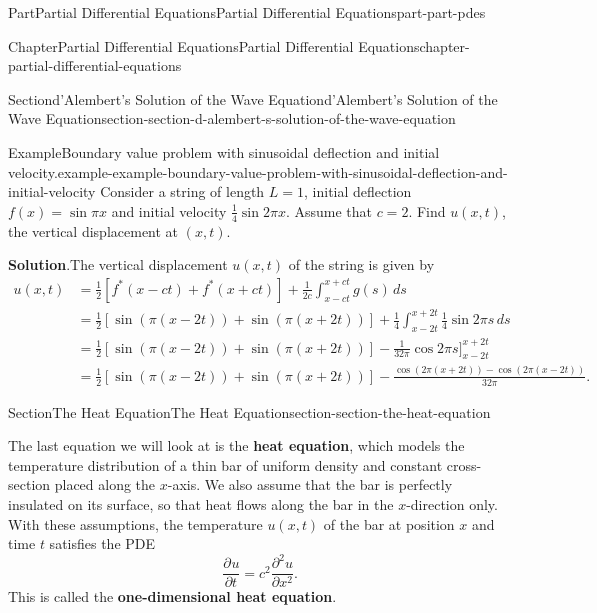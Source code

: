 \documentclass[twoside,10pt,]{book}
\newcommand{\blocktitlefont}{\relax}
\newcommand{\terminology}[1]{\textbf{#1}}
\numberwithin{equation}{part}
\newcommand{\pdv}[3][]{\dfrac{\partial^{#1} #2}{\partial #3^{#1}}}
\newcommand{\amp}{&}
\begin{document}
\begin{partptx}{Part}{Partial Differential Equations}{}{Partial Differential Equations}{}{}{part-part-pdes}
\begin{chapterptx}{Chapter}{Partial Differential Equations}{}{Partial Differential Equations}{}{}{chapter-partial-differential-equations}
\begin{sectionptx}{Section}{d'Alembert's Solution of the Wave Equation}{}{d'Alembert's Solution of the Wave Equation}{}{}{section-section-d-alembert-s-solution-of-the-wave-equation}
\begin{example}{Example}{Boundary value problem with sinusoidal deflection and initial velocity.}{example-example-boundary-value-problem-with-sinusoidal-deflection-and-initial-velocity}%
Consider a string of length \(L=1\), initial deflection \(f(x) = \sin\pi x\) and initial velocity \(\frac{1}{4}\sin2\pi x\). Assume that \(c = 2\). Find \(u(x,t)\), the vertical displacement at \((x,t)\).%
\par\smallskip%
\noindent\textbf{\blocktitlefont Solution}.\hypertarget{solution-example-boundary-value-problem-with-sinusoidal-deflection-and-initial-velocity-c}{}\quad{}The vertical displacement \(u(x,t)\) of the string is given by%
%
\begin{align*}
u(x,t) \amp = \frac{1}{2}[f^{*}(x-ct)+f^{*}(x+ct)] + \frac{1}{2c}\int_{x-ct}^{x+ct}g(s)\,ds \\
\amp = \frac{1}{2}[\sin(\pi(x-2t))+\sin(\pi(x+2t))] + \frac{1}{4}\int_{x-2t}^{x+2t}\frac{1}{4}\sin2\pi s\,ds \\
\amp = \frac{1}{2}[\sin(\pi(x-2t))+\sin(\pi(x+2t))] - \frac{1}{32\pi}\cos2\pi s\Bigg]_{x-2t}^{x+2t} \\
\amp = \frac{1}{2}[\sin(\pi(x-2t))+\sin(\pi(x+2t))] - \frac{\cos(2\pi(x+2t)) - \cos(2\pi(x-2t))}{32\pi} \text{.}
\end{align*}
\end{example}
\end{sectionptx}
%
%
\typeout{************************************************}
\typeout{************************************************}
%
\begin{sectionptx}{Section}{The Heat Equation}{}{The Heat Equation}{}{}{section-section-the-heat-equation}
\begin{introduction}{}%
The last equation we will look at is the \terminology{heat equation}, which models the temperature distribution of a thin bar of uniform density and constant cross-section placed along the \(x\)-axis. We also assume that the bar is perfectly insulated on its surface, so that heat flows along the bar in the \(x\)-direction only. With these assumptions, the temperature \(u(x,t)\) of the bar at position \(x\) and time \(t\) satisfies the PDE%
%
\begin{equation}
\pdv{u}{t} = c^{2}\pdv[2]{u}{x}\text{.}\label{men-equation-heat-pde}
\end{equation}
This is called the \terminology{one-dimensional heat equation}.%
\end{introduction}%
%

\end{sectionptx}
\end{chapterptx}
\end{partptx}
\end{document}
